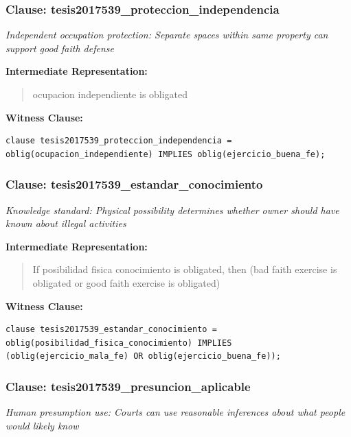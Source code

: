 \documentclass[11pt,a4paper]{article}
\begin{document}
\subsubsection{Clause: tesis2017539\_proteccion\_independencia}

\textit{Independent occupation protection: Separate spaces within same property can support good faith defense}

\textbf{Intermediate Representation:}

\begin{quote}
ocupacion independiente is obligated
\end{quote}

\textbf{Witness Clause:}

\begin{lstlisting}[style=witnessstyle, language=Witness]
clause tesis2017539_proteccion_independencia = oblig(ocupacion_independiente) IMPLIES oblig(ejercicio_buena_fe);
\end{lstlisting}

\subsubsection{Clause: tesis2017539\_estandar\_conocimiento}

\textit{Knowledge standard: Physical possibility determines whether owner should have known about illegal activities}

\textbf{Intermediate Representation:}

\begin{quote}
If posibilidad fisica conocimiento is obligated, then (bad faith exercise is obligated or good faith exercise is obligated)
\end{quote}

\textbf{Witness Clause:}

\begin{lstlisting}[style=witnessstyle, language=Witness]
clause tesis2017539_estandar_conocimiento = oblig(posibilidad_fisica_conocimiento) IMPLIES (oblig(ejercicio_mala_fe) OR oblig(ejercicio_buena_fe));
\end{lstlisting}

\subsubsection{Clause: tesis2017539\_presuncion\_aplicable}

\textit{Human presumption use: Courts can use reasonable inferences about what people would likely know}
\end{document}
